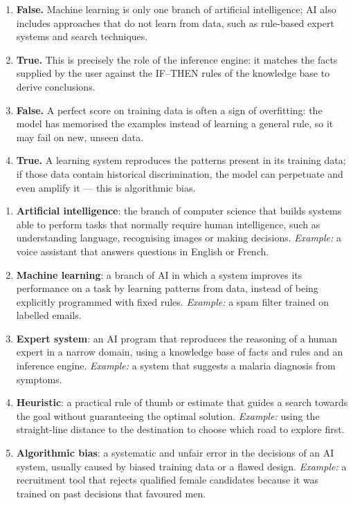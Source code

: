 \documentclass[11pt]{article}
\newcommand{\cle}[1]{{\popxbold\color{popdark}#1}}
\begin{document}
\begin{corrige}
\begin{enumerate}
\item \textbf{False.} Machine learning is only one branch of artificial intelligence; AI also includes approaches that do not learn from data, such as rule-based expert systems and search techniques.
\item \textbf{True.} This is precisely the role of the inference engine: it matches the facts supplied by the user against the IF--THEN rules of the knowledge base to derive conclusions.
\item \textbf{False.} A perfect score on training data is often a sign of \cle{overfitting}: the model has memorised the examples instead of learning a general rule, so it may fail on new, unseen data.
\item \textbf{True.} A learning system reproduces the patterns present in its training data; if those data contain historical discrimination, the model can perpetuate and even amplify it --- this is \cle{algorithmic bias}.
\end{enumerate}
\end{corrige}

\begin{corrige}
\begin{enumerate}
\item \textbf{Artificial intelligence}: the branch of computer science that builds systems able to perform tasks that normally require human intelligence, such as understanding language, recognising images or making decisions. \emph{Example:} a voice assistant that answers questions in English or French.
\item \textbf{Machine learning}: a branch of AI in which a system improves its performance on a task by learning patterns from data, instead of being explicitly programmed with fixed rules. \emph{Example:} a spam filter trained on labelled emails.
\item \textbf{Expert system}: an AI program that reproduces the reasoning of a human expert in a narrow domain, using a knowledge base of facts and rules and an inference engine. \emph{Example:} a system that suggests a malaria diagnosis from symptoms.
\item \textbf{Heuristic}: a practical rule of thumb or estimate that guides a search towards the goal without guaranteeing the optimal solution. \emph{Example:} using the straight-line distance to the destination to choose which road to explore first.
\item \textbf{Algorithmic bias}: a systematic and unfair error in the decisions of an AI system, usually caused by biased training data or a flawed design. \emph{Example:} a recruitment tool that rejects qualified female candidates because it was trained on past decisions that favoured men.
\end{enumerate}
\end{corrige}
\end{document}
